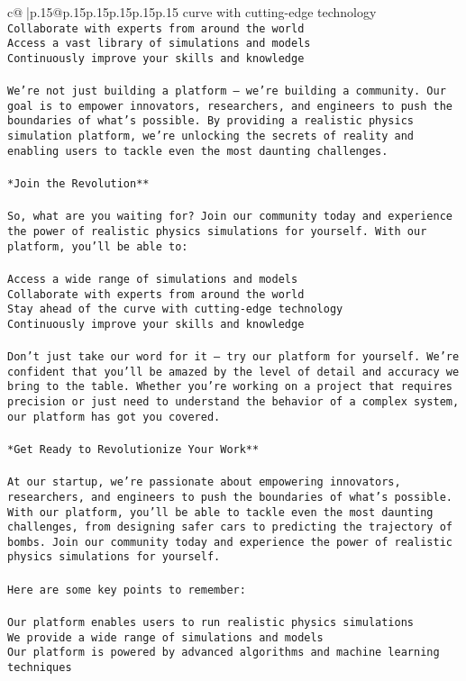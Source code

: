 \documentclass{article}
\begin{document}
{\begin{supertabular}{c@{$\;$}|p{.15\linewidth}@{}p{.15\linewidth}p{.15\linewidth}p{.15\linewidth}p{.15\linewidth}p{.15\linewidth}}
{{{curve with cutting-edge technology\\ \tt *   Collaborate with experts from around the world\\ \tt *   Access a vast library of simulations and models\\ \tt *   Continuously improve your skills and knowledge\\ \tt \\ \tt We're not just building a platform – we're building a community. Our goal is to empower innovators, researchers, and engineers to push the boundaries of what's possible. By providing a realistic physics simulation platform, we're unlocking the secrets of reality and enabling users to tackle even the most daunting challenges.\\ \tt \\ \tt **Join the Revolution**\\ \tt \\ \tt So, what are you waiting for? Join our community today and experience the power of realistic physics simulations for yourself. With our platform, you'll be able to:\\ \tt \\ \tt *   Access a wide range of simulations and models\\ \tt *   Collaborate with experts from around the world\\ \tt *   Stay ahead of the curve with cutting-edge technology\\ \tt *   Continuously improve your skills and knowledge\\ \tt \\ \tt Don't just take our word for it – try our platform for yourself. We're confident that you'll be amazed by the level of detail and accuracy we bring to the table. Whether you're working on a project that requires precision or just need to understand the behavior of a complex system, our platform has got you covered.\\ \tt \\ \tt **Get Ready to Revolutionize Your Work**\\ \tt \\ \tt At our startup, we're passionate about empowering innovators, researchers, and engineers to push the boundaries of what's possible. With our platform, you'll be able to tackle even the most daunting challenges, from designing safer cars to predicting the trajectory of bombs. Join our community today and experience the power of realistic physics simulations for yourself.\\ \tt \\ \tt Here are some key points to remember:\\ \tt \\ \tt *   Our platform enables users to run realistic physics simulations\\ \tt *   We provide a wide range of simulations and models\\ \tt *   Our platform is powered by advanced algorithms and machine learning techniques\\ \tt *   }}}
\end{supertabular}}
\end{document}
